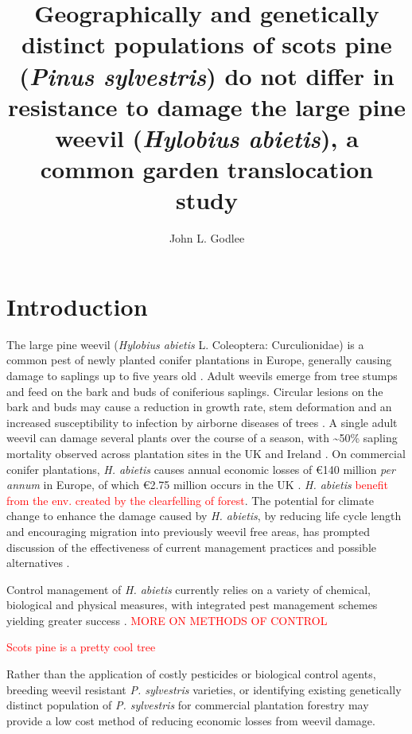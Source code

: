 \documentclass[a4paper, 11pt]{article}
\title{Geographically and genetically distinct populations of scots pine (\textit{Pinus sylvestris}) do not differ in resistance to damage the large pine weevil (\textit{Hylobius abietis}), a common garden translocation study}
\author{John L. Godlee}
\newcommand{\todo}[1]{\textcolor{red}{#1}}   %
\begin{document}

\maketitle{}

\begin{abstract}
\end{abstract}

\section*{Introduction}

The large pine weevil (\textit{Hylobius abietis} L. Coleoptera: Curculionidae) is a common pest of newly planted conifer plantations in Europe, generally causing damage to saplings up to five years old \citep{Dillon2008}. Adult weevils emerge from tree stumps and feed on the bark and buds of coniferious saplings. Circular lesions on the bark and buds may cause a reduction in growth rate, stem deformation and an increased susceptibility to infection by airborne diseases of trees \citep{Leather1999}. A single adult weevil can damage several plants over the course of a season, with \textasciitilde{}50\% sapling mortality observed across plantation sites in the UK and Ireland \citep{Heritage2001}. On commercial conifer plantations, \textit{H. abietis} causes annual economic losses of \euro{}140 million \textit{per annum} in Europe, of which \euro{}2.75 million occurs in the UK \citep{Evans2015}. \textit{H. abietis} \todo{benefit from the env. created by the clearfelling of forest}. The potential for climate change to enhance the damage caused by \textit{H. abietis}, by reducing life cycle length and encouraging migration into previously weevil free areas, has prompted discussion of the effectiveness of current management practices and possible alternatives \citep{}.

Control management of \textit{H. abietis} currently relies on a variety of chemical, biological and physical measures, with integrated pest management schemes yielding greater success \citep{}. \todo{MORE ON METHODS OF CONTROL}

\todo{Scots pine is a pretty cool tree}

Rather than the application of costly pesticides or biological control agents, breeding weevil resistant \textit{P. sylvestris} varieties, or identifying existing genetically distinct population of \textit{P. sylvestris} for commercial plantation forestry may provide a low cost method of reducing economic losses from weevil damage.
\end{document}
